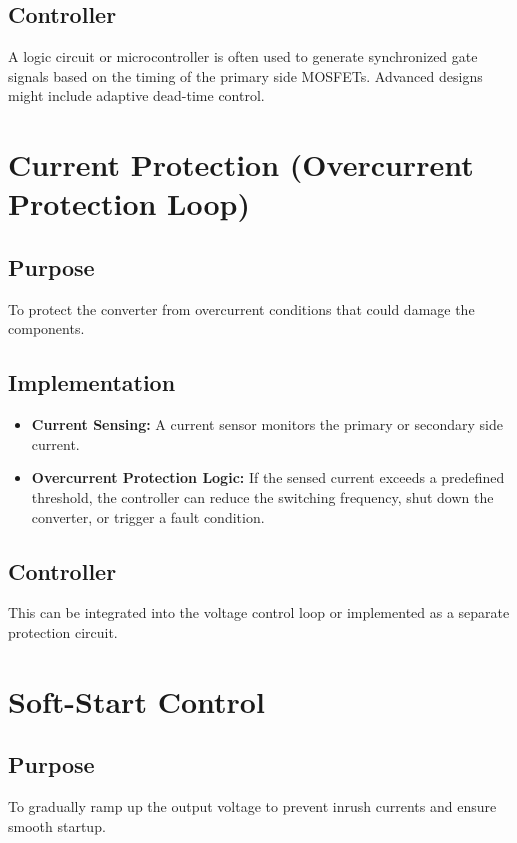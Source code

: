 \documentclass{article}
\begin{document}
\subsection{Controller}
A logic circuit or microcontroller is often used to generate synchronized gate signals based on the timing of the primary side MOSFETs. Advanced designs might include adaptive dead-time control.

\section{Current Protection (Overcurrent Protection Loop)}
\label{sec:current_protection}
\subsection{Purpose}
To protect the converter from overcurrent conditions that could damage the components.

\subsection{Implementation}
\begin{itemize}
    \item \textbf{Current Sensing:} A current sensor monitors the primary or secondary side current.
    \item \textbf{Overcurrent Protection Logic:} If the sensed current exceeds a predefined threshold, the controller can reduce the switching frequency, shut down the converter, or trigger a fault condition.
\end{itemize}

\subsection{Controller}
This can be integrated into the voltage control loop or implemented as a separate protection circuit.

\section{Soft-Start Control}
\label{sec:soft_start_control}
\subsection{Purpose}
To gradually ramp up the output voltage to prevent inrush currents and ensure smooth startup.
\end{document}
